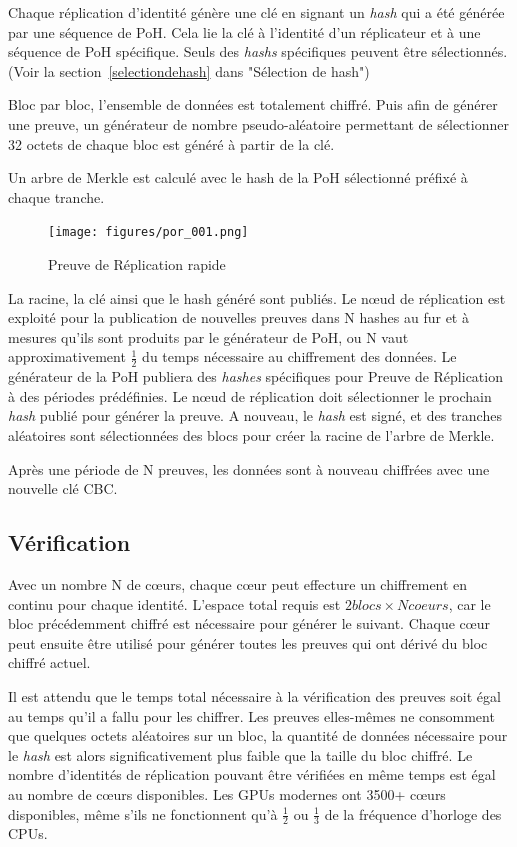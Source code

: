 \documentclass[12pt]{article}
\begin{document}
Chaque réplication d’identité génère une clé en signant un \textit{hash} qui a été générée par une séquence de PoH. Cela lie la clé à l’identité d’un réplicateur et à une séquence de PoH spécifique. Seuls des \textit{hashs} spécifiques peuvent être sélectionnés. (Voir la section~\ref{selectiondehash} dans "Sélection de hash")

Bloc par bloc, l’ensemble de données est totalement chiffré. Puis afin de générer une preuve, un générateur de nombre pseudo-aléatoire permettant de sélectionner 32 octets de chaque bloc est généré à partir de la clé.

Un arbre de Merkle est calculé avec le hash de la PoH sélectionné préfixé à chaque tranche.

\begin{figure}[h]
  \begin{center}
    \centering
    \texttt{[image: figures/por\_001.png]}
    \caption[Fig 8]{Preuve de Réplication rapide \label{fig_8}}
  \end{center}
  \end{figure}

La racine, la clé ainsi que le hash généré sont publiés. Le nœud de réplication est exploité pour la publication de nouvelles preuves dans N hashes au fur et à mesures qu'ils sont produits par le générateur de PoH, ou N vaut approximativement \(\frac{1}{2}\) du temps nécessaire au chiffrement des données. Le générateur de la PoH publiera des \textit{hashes} spécifiques pour Preuve de Réplication à des périodes prédéfinies. Le nœud de réplication doit sélectionner le prochain \textit{hash} publié pour générer la preuve. A nouveau, le \textit{hash} est signé, et des tranches aléatoires sont sélectionnées des blocs pour créer la racine de l'arbre de Merkle.

Après une période de N preuves, les données sont à nouveau chiffrées avec une nouvelle clé CBC.

\subsection{Vérification}
Avec un nombre N de cœurs, chaque cœur peut effecture un chiffrement en continu pour chaque identité. L’espace total requis est \(2 blocs \times N coeurs\), car le bloc précédemment chiffré est nécessaire pour générer le suivant. Chaque cœur peut ensuite être utilisé pour générer toutes les preuves qui ont dérivé du bloc chiffré actuel.

Il est attendu que le temps total nécessaire à la vérification des preuves soit égal au temps qu'il a fallu pour les chiffrer. Les preuves elles-mêmes ne consomment que quelques octets aléatoires sur un bloc, la quantité de données nécessaire pour le \textit{hash} est alors significativement plus faible que la taille du bloc chiffré. Le nombre d’identités de réplication pouvant être vérifiées en même temps est égal au nombre de cœurs disponibles. Les GPUs modernes ont 3500+ cœurs disponibles, même s'ils ne fonctionnent qu'à \(\frac{1}{2}\) ou \(\frac{1}{3}\) de la fréquence d’horloge des CPUs.
\end{document}
